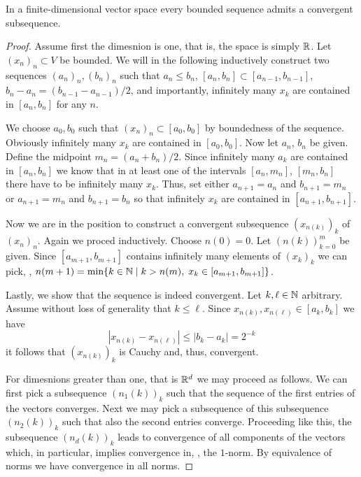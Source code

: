 \begin{theorem}\label{thm:bolzano}
    In a finite-dimensional vector space every bounded sequence admits a convergent subsequence.    
\end{theorem}
\begin{proof}
    Assume first the dimesnion is one, that is, the space is simply $\mathbb{R}$. Let $(x_n)_n\subset V$ be bounded. We will in the following inductively construct two sequences $(a_n)_n, (b_n)_n$ such that $a_n\leq b_n$, $[a_n,b_n]\subset [a_{n-1},b_{n-1}]$, $b_n-a_n = (b_{n-1}-a_{n-1})/2$, and importantly, infinitely many $x_k$ are contained in $[a_n,b_n]$ for any $n$.
    
    We choose $a_0,b_0$ such that $(x_n)_n\subset [a_0,b_0]$ by boundedness of the sequence. Obviously infinitely many $x_k$ are contained in $[a_0,b_0]$. Now let $a_n$, $b_n$ be given. Define the midpoint $m_n = (a_n+b_n)/2$. Since infinitely many $a_k$ are contained in $[a_n,b_n]$ we know that in at least one of the intervals $[a_n,m_n]$, $[m_n,b_n]$ there have to be infinitely many $x_k$. Thus, set either $a_{n+1} = a_n$ and $b_{n+1} = m_n$ or $a_{n+1} = m_n$ and $b_{n+1} = b_n$ so that infinitely $x_k$ are contained in $[a_{n+1},b_{n+1}]$.

    Now we are in the position to construct a convergent subsequence $(x_{n(k)})_k$ of $(x_n)_n$. Again we proced inductively. Choose $n(0)=0$. Let $(n(k))_{k=0}^m$ be given. Since $[a_{m+1},b_{m+1}]$ contains infinitely many elements of $(x_k)_k$ we can pick, \eg, $n(m+1) = \min\{k\in\mathbb{N}\;|\; k>n(m),\; x_k\in [a_{m+1},b_{m+1}]\}$.

    Lastly, we show that the sequence is indeed convergent. Let $k,\ell\in\mathbb{N}$ arbitrary. Assume without loss of generality that $k\leq \ell$. Since $x_{n(k)}, x_{n(\ell)}\in [a_{k},b_{k}]$ we have 
    \begin{equation}
        |x_{n(k)}-x_{n(\ell)}|\leq |b_{k}-a_{k}| = 2^{-k}
    \end{equation}
    it follows that $(x_{n(k)})_k$ is Cauchy and, thus, convergent.

    For dimesnions greater than one, that is $\mathbb{R}^d$ we may proceed as follows. We can first pick a subsequence $(n_1(k))_k$ such that the sequence of the first entries of the vectors converges. Next we may pick a subsequence of this subsequence $(n_2(k))_k$ such that also the second entries converge. Proceeding like this, the subsequence $(n_d(k))_k$ leads to convergence of all components of the vectors which, in particular, implies convergence in, \eg, the $1$-norm. By equivalence of norms we have convergence in all norms.
\end{proof}

